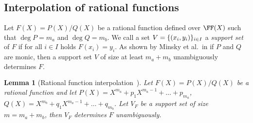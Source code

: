 \documentclass[runningheads]{llncs}
\newtheorem{lemma}[theorem]{Lemma}
\theoremstyle{definition}
\begin{document}
\subsection{Interpolation of rational functions}
Let $F(X) = P(X) / Q(X)$ be a rational function defined over $\FF(X)$ such that $\deg P = m_a$ and $\deg Q = m_b$. We call a set $V = \{(x_i, y_i)\}_{i \in I}$ a \emph{support set} of $F$ if for all $i \in I$ holds $F(x_i) = y_i$. 
As shown by Minsky et al.~in \cite{TIT:MinTraZip03} if $P$ and $Q$ are monic, then a support set $V$ of size at least $m_a + m_b$ unambiguously determines $F$. 

\begin{lemma}[Rational function interpolation~{\cite[Theorem 4.1]{TIT:MinTraZip03}}]
	\label{lem:rational_function_interpolation}
  Let $F(X) = P(X) / Q(X)$ be a rational function and let $P(X) = X^{m_a} + p_1 X^{m_a - 1} + \ldots + p_{m_a}$, $Q(X) = X^{m_b} + q_1 X^{m_a - 1} + \ldots + q_{m_b}$. Let $V_F$ be a support set of size $m = m_a + m_b$, then $V_F$ determines $F$ unambiguously.
\end{lemma}
\end{document}
